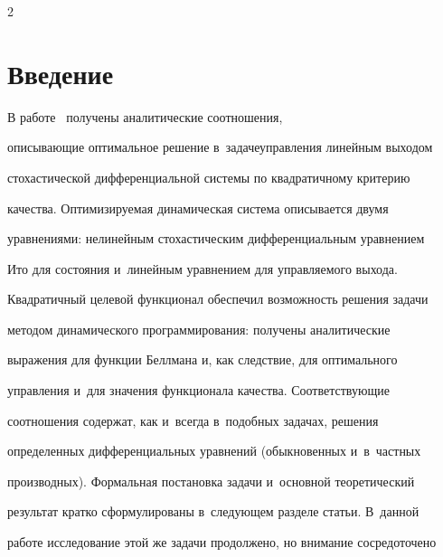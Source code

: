 




\thispagestyle{headings}





\begin{multicols}{2}





\label{st\stat}





\section{Введение}


     


     В работе~\cite{1-b} получены аналитические соотноше\-ния, 


описывающие оптимальное решение в~задаче\linebreak управления линейным выходом 


стохастической дифференциальной системы по квадратичному критерию 


качества. Оптимизируемая динамическая система описывается двумя 


уравнениями: нелинейным стохастическим дифференциальным уравнением 


Ито для состояния и~линейным уравнением для управляемого выхода. 


Квадратичный целевой функционал обеспечил возможность решения задачи 


методом динамического программирования: получены аналитические 


выражения для функции Беллмана и, как следствие, для оптимального 


управления и~для значения функционала качества. Соответствующие 


соотношения содержат, как и~всегда в~подобных задачах, решения 


определенных дифференциальных уравнений (обыкновенных и~в~частных 


производных). Формальная постановка задачи и~основной теоретический 


результат кратко сформулированы в~следующем разделе статьи. В~данной 


работе исследование этой же задачи продолжено, но внимание сосредоточено 



\end{multicols}
